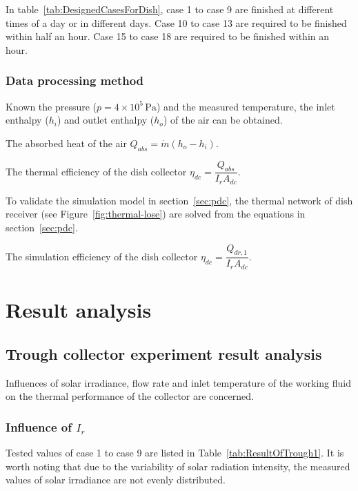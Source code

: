 In table~\ref{tab:DesignedCasesForDish}, case 1 to case 9 are finished at different times of a day or in different days. Case 10 to case 13 are required to be finished within half an hour. Case 15 to case 18 are required to be finished within an hour.

\subsubsection{Data processing method}
Known the pressure ($p = 4\times10^5\,\mathrm{Pa}$) and the measured temperature, the inlet enthalpy ($h_i$) and outlet enthalpy ($h_o$) of the air can be obtained.

The absorbed heat of the air $Q_{abs} = \dot{m}(h_o - h_i)$.

The thermal efficiency of the dish collector $\eta_{dc} = \dfrac{Q_{abs}}{I_r A_{dc}}$. 

To validate the simulation model in section~\ref{sec:pdc}, %
the thermal network of dish receiver (see Figure~\ref{fig:thermal-lose}) are solved from the equations in section~\ref{sec:pdc}.

The simulation efficiency of the dish collector $\eta_{dc} = \dfrac{Q_{dr,1}}{I_r A_{dc}}$.

\section{Result analysis}
\subsection{Trough collector experiment result analysis}
Influences of solar irradiance, flow rate and inlet temperature of the working fluid on the thermal performance of the collector are concerned.
\subsubsection{Influence of $I_r$}
Tested values of case 1 to case 9 are listed in Table~\ref{tab:ResultOfTrough1}. It is worth noting that due to the variability of solar radiation intensity, the measured values of solar irradiance are not evenly distributed.

